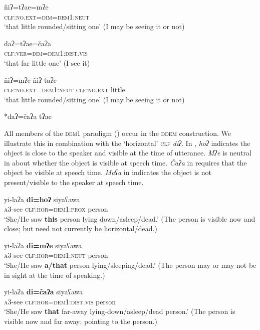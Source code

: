 \documentclass[output=paper,colorlinks,citecolor=brown]{langscibook}
\begin{document}
\ea\label{ex:payne:29}
\gll  ñiʔ=tʔae=mʔe\\
\textsc{clf:no.ext=dim=dem1:neut}\\
\glt ‘that little rounded/sitting one’ (I may be seeing it or not)
\z

\ea\label{ex:payne:30}
\gll  daʔ=tʔae=čaʔa\\
 \textsc{clf:ver=dim=dem1:dist.vis}\\
\glt ‘that far little one’ (I see it)
\z

\ea\label{ex:payne:31}
\gll  ñiʔ=mʔe  ñiʔ  taʔe\\
\textsc{clf:no.ext=dem1:neut}  \textsc{clf:no.ext}  little\\
\glt ‘that little rounded/sitting one’ (I may be seeing it or not)
\z

\ea\label{ex:payne:32}
 *daʔ=čaʔa  tʔae\\
\z

All members of the \textsc{dem}1 paradigm () occur in the \textsc{ddem} construction. We illustrate this in combination with the ‘horizontal’ \textsc{clf} \textit{diʔ}. In , \textit{hoʔ} indicates the object is close to the speaker and visible at the time of utterance. \textit{Mʔe} is neutral in  about whether the object is visible at speech time. \textit{Čaʔa} in  requires that the object be visible at speech time. \textit{Maʕa} in  indicates the object is not present/visible to the speaker at speech time.

\ea\label{ex:payne:33}
\gll  yi-laʔa  \textbf{di=hoʔ}  siyaʕawa\\
 \textsc{a3}-see \textsc{clf:hor=dem1:prox} person\\
\glt ‘She/He saw \textbf{this} person lying down/asleep/dead.’ (The person is visible now and close; but need not currently be horizontal/dead.)
\z

\ea\label{ex:payne:34}
\gll  yi-laʔa  \textbf{di=mʔe}  siyaʕawa\\
\textsc{a3}-see  \textsc{clf:hor=dem1:neut} person\\
\glt ‘She/He saw \textbf{a/that} person lying/sleeping/dead.’ (The person may or may not be in sight at the time of speaking.)
\z

\ea\label{ex:payne:35}
\gll  yi-laʔa  \textbf{di=čaʔa}  siyaʕawa\\
 \textsc{a3}-see \textsc{clf:hor=dem1:dist.vis} person\\
\glt ‘She/He saw \textbf{that} far-away lying-down/asleep/dead person.’ (The person is visible now and far away; pointing to the person.)
\z
\end{document}
